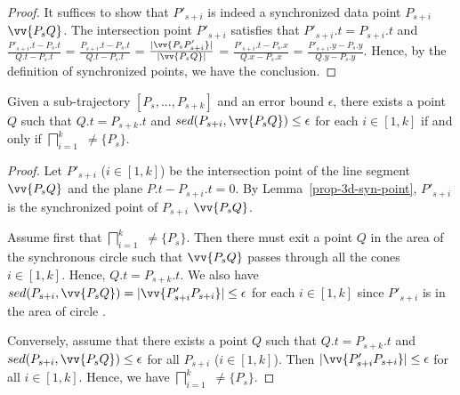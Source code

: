 \begin{proof} It suffices to show that $P'_{s+i}$ is indeed a synchronized data point $P_{s+i}$ \wrt $\vv{P_sQ}$.
%
The intersection point $P'_{s+i}$ satisfies that $P'_{s+i}.t = P_{s+i}.t$ and
$\frac{P'_{s+i}.t - P_{s}.t}{Q.t - P_{s}.t}$ = $\frac{P_{s+i}.t - P_{s}.t}{Q.t - P_{s}.t}$  =
$\frac{|\vv{P_sP'_{s+i}}|}{|\vv{P_sQ}|}$ =
$\frac{P'_{s+i}.t - P_{s}.x}{Q.x - P_{s}.x}$ = $\frac{P'_{s+i}.y - P_{s}.y}{Q.y - P_{s}.y}$.
%
Hence, by the definition of synchronized points, we have the conclusion.
\end{proof}






\begin{prop}
\label{prop-3d-ci}
Given a sub-trajectory $[P_s,...,P_{s+k}]$ and an error bound $\epsilon$, there exists a point $Q$ such that $Q.t = P_{s+k}.t$ and $sed(P_{s+i}, \vv{P_sQ})\le \epsilon$ for each $i \in [1,k]$ if and only if $\bigsqcap_{i=1}^{k}$ $\ne \{P_s\}$.
\end{prop}

\begin{proof}
Let $P'_{s+i}$ ($i\in[1, k]$) be the intersection point of the line segment $\vv{P_sQ}$ and the plane $P.t - P_{s+i}.t=0$.
By Lemma~\ref{prop-3d-syn-point}, $P'_{s+i}$ is the synchronized point of $P_{s+i}$ \wrt $\vv{P_sQ}$.

Assume first that $\bigsqcap_{i=1}^{k}$ $\ne \{P_s\}$. Then there must exit a point $Q $ in the area of the  synchronous circle  such that $\vv{P_sQ}$ passes through all the cones  $i\in[1, k]$. Hence,  $Q.t = P_{s+k}.t$.
We also have $sed(P_{s+i}, \vv{P_sQ}) = |\vv{P'_{s+i}P_{s+i}}| \le \epsilon$ for each $i \in [1, k]$  since $P'_{s+i}$  is in the area of circle  .

Conversely, assume that there exists a point $Q$ such that $Q.t = P_{s+k}.t$ and $sed(P_{s+i}, \vv{P_sQ})\le\epsilon$ for all $P_{s+i}$ ($i \in [1,k]$). Then $|\vv{P'_{s+i}P_{s+i}}| \le \epsilon$ for all $i \in [1, k]$. Hence, we have  $\bigsqcap_{i=1}^{k}$ $\ne \{P_s\}$.
\end{proof}


